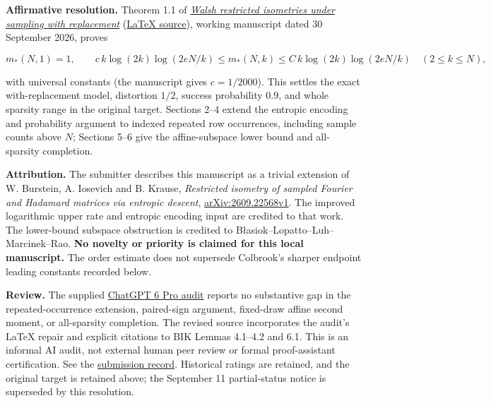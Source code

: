 \documentclass[11pt,a4paper]{article}
\makeatletter
\renewcommand{\subsection}{\Needspace{4\baselineskip}\@startsection{subsection}{2}{0pt}{9pt plus 1pt minus 1pt}{3pt}{\sffamily\bfseries\normalsize\color{ink}}}
\makeatother
\begin{document}
\subsection{Resolution --- 2026-09-30}\label{resolution-2026-09-30}

\textbf{Affirmative resolution.} Theorem 1.1 of
\href{https://github.com/ajt60gaibb/OpenProblemsInNLA/blob/main/references/haidary-resolutions-2026-09-30/Walsh_RIP_with_replacement_revised.pdf}{\emph{Walsh
restricted isometries under sampling with replacement}}
(\href{https://github.com/ajt60gaibb/OpenProblemsInNLA/blob/main/references/haidary-resolutions-2026-09-30/Walsh_RIP_with_replacement_revised.tex}{LaTeX
source}), working manuscript dated 30 September 2026, proves

\[m_*(N,1)=1,\qquad
c\,k\log(2k)\log(2eN/k)\le m_*(N,k)
\le C\,k\log(2k)\log(2eN/k)\quad(2\le k\le N),\]

with universal constants (the manuscript gives \(c=1/2000\)). This
settles the exact with-replacement model, distortion \(1/2\), success
probability \(0.9\), and whole sparsity range in the original target.
Sections 2--4 extend the entropic encoding and probability argument to
indexed repeated row occurrences, including sample counts above \(N\);
Sections 5--6 give the affine-subspace lower bound and all-sparsity
completion.

\textbf{Attribution.} The submitter describes this manuscript as a
trivial extension of W. Burstein, A. Iosevich and B. Krause,
\emph{Restricted isometry of sampled Fourier and Hadamard matrices via
entropic descent},
\href{https://arxiv.org/abs/2609.22568v1}{arXiv:2609.22568v1}. The
improved logarithmic upper rate and entropic encoding input are credited
to that work. The lower-bound subspace obstruction is credited to
Błasiok--Lopatto--Luh--Marcinek--Rao. \textbf{No novelty or priority is
claimed for this local manuscript.} The order estimate does not
supersede Colbrook's sharper endpoint leading constants recorded below.

\textbf{Review.} The supplied
\href{https://chatgpt.com/share/6abd4125-5848-83eb-9598-f9b2d8822c71}{ChatGPT
6 Pro audit} reports no substantive gap in the repeated-occurrence
extension, paired-sign argument, fixed-draw affine second moment, or
all-sparsity completion. The revised source incorporates the audit's
LaTeX repair and explicit citations to BIK Lemmas 4.1--4.2 and 6.1. This
is an informal AI audit, not external human peer review or formal
proof-assistant certification. See the
\href{https://github.com/ajt60gaibb/OpenProblemsInNLA/blob/main/references/haidary-resolutions-2026-09-30/README.md}{submission
record}. Historical ratings are retained, and the original target is
retained above; the September 11 partial-status notice is superseded by
this resolution.
\end{document}
